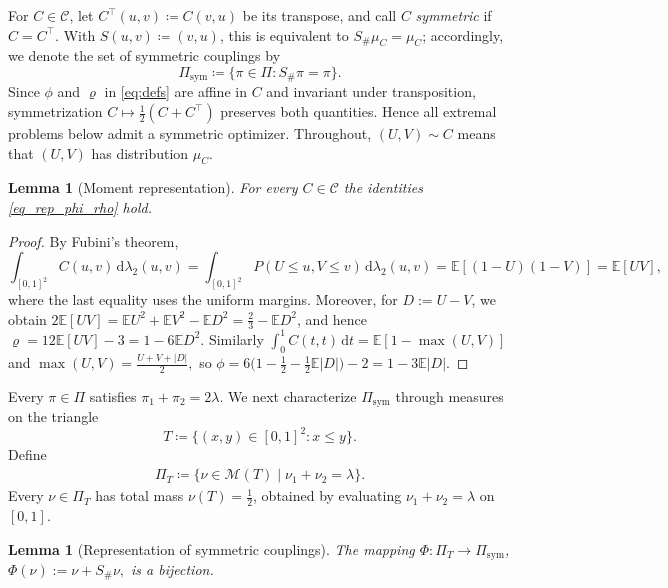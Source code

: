 \documentclass{article}
\newtheorem{lemma}[theorem]{Lemma}
\newcommand{\CC}{\mathcal{C}}
\newcommand{\de}{\mathrm{\,d}}
\newcommand{\lam}{\lambda}
\newcommand{\E}{\mathbb{E}}
\newcommand{\cM}{\mathcal{M}}
\begin{document}
For \(C\in\CC\), let \(C^\top(u,v)\coloneqq C(v,u)\) be its transpose, and call \(C\) \emph{symmetric} if \(C=C^\top\).
With \(S(u,v)\coloneqq(v,u)\), this is equivalent to \(S_\#\mu_C=\mu_C\); accordingly, we denote the set of symmetric couplings by
\[
    \Pi_{\operatorname{sym}}
    \coloneqq
    \{\pi\in\Pi:S_\#\pi=\pi\}.
\]
Since \(\phi\) and \(\varrho\) in \eqref{eq:defs} are affine in \(C\) and invariant under transposition, symmetrization \(C\mapsto\tfrac12(C+C^\top)\) preserves both quantities.
Hence all extremal problems below admit a symmetric optimizer.
Throughout, \((U,V)\sim C\) means that \((U,V)\) has distribution \(\mu_C\).

\begin{lemma}[Moment representation]\label{lem:moments}
	For every $C\in\CC$ the identities \eqref{eq_rep_phi_rho} hold.
\end{lemma}

\begin{proof}
	By Fubini's theorem,
	\[
	\int_{[0,1]^2}C(u,v)\de\lam_2(u,v)
	=\int_{[0,1]^2}P(U\le u, V\le v)\de\lam_2(u,v)
	=\E[(1-U)(1-V)]
	=\E[UV],
	\]
	where the last equality uses the uniform margins.
	Moreover, for \(D:= U-V\), we obtain $2\E[UV]=\E U^2+\E V^2-\E D^2=\tfrac23-\E D^2$, and hence
	\(
	\varrho=12\E[UV]-3=1-6\E D^2.
	\)
	Similarly
	\(
	\int_0^1 C(t,t)\de t=\E[1-\max(U,V)]
	\)
	and
	\(
	\max(U,V)=\tfrac{U+V+|D|}{2},
	\)
	so
	\(
	\phi=6\bigl(1-\tfrac12-\tfrac12\E|D|\bigr)-2=1-3\E|D|.
	\)
\end{proof}

Every \(\pi\in\Pi\) satisfies \(\pi_1+\pi_2=2\lam\).
We next characterize \(\Pi_{\operatorname{sym}}\) through measures on the triangle
\[
    T\coloneqq\{(x,y)\in[0,1]^2:x\leq y\}.
\]
Define
\begin{align}\label{def:Pi_T}
    \Pi_T \coloneqq \{ \nu\in \cM(T)\mid \nu_1 + \nu_2 = \lam\}.
\end{align}
Every \(\nu\in\Pi_T\) has total mass \(\nu(T)=\tfrac12\), obtained by evaluating \(\nu_1+\nu_2=\lam\) on \([0,1]\).


\begin{lemma}[Representation of symmetric couplings]\label{lem:pair-measure-bijection}
    The mapping \(    \Phi:\Pi_T\to\Pi_{\mathrm{sym}}\), \(\Phi(\nu):=\nu+S_\#\nu, \) is a bijection.
\end{lemma}
\end{document}
